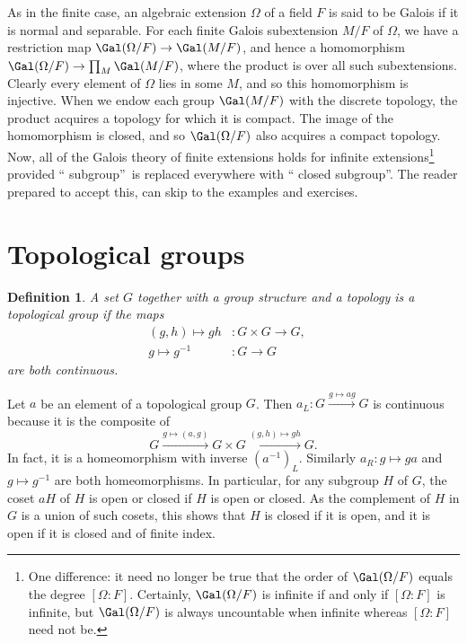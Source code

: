 \documentclass[a4paper,11pt,final,openany]{memoir}
\newtheorem{definition}[X]{Definition}
\theoremstyle{nonumberplain}
\begin{document}
As in the finite case, an algebraic extension $\Omega$ of a field $F$ is said
to be Galois if it is normal and separable. For each finite Galois
subextension $M/F$ of $\Omega$, we have a restriction map $\Gal(\Omega
/F)\rightarrow\Gal(M/F)$, and hence a homomorphism $\Gal(\Omega/F)\rightarrow
\prod\nolimits_{M}\Gal(M/F)$, where the product is over all such
subextensions. Clearly every element of $\Omega$ lies in some $M$, and so this
homomorphism is injective. When we endow each group $\Gal(M/F)$ with the
discrete topology, the product acquires a topology for which it is compact.
The image of the homomorphism is closed, and so $\Gal(\Omega/F)$ also acquires
a compact topology. Now, all of the Galois theory of finite extensions holds
for infinite extensions\footnote{One difference: it need no longer be true
that the order of $\Gal(\Omega/F)$ equals the degree $[\Omega\colon F]$.
Certainly, $\Gal(\Omega/F)$ is infinite if and only if $[\Omega\colon F]$ is
infinite, but $\Gal(\Omega/F)$ is always uncountable when infinite whereas
$[\Omega\colon F]$ need not be.} provided \textquotedblleft
subgroup\textquotedblright\ is replaced everywhere with \textquotedblleft
closed subgroup\textquotedblright. The reader prepared to accept this, can
skip to the examples and exercises.

\section{Topological groups}

\begin{definition}
\label{ig1}A set $G$ together with a group structure and a topology is a%
\emph{topological group }if the maps
\begin{align*}
(g,h)\mapsto gh  &  \colon G\times G\rightarrow G,\quad\\
g\mapsto g^{-1}  &  \colon G\rightarrow G
\end{align*}
are both continuous.
\end{definition}

Let $a$ be an element of a topological group $G$. Then $a_{L}\colon
G\xrightarrow{g\mapsto ag}G$ is continuous because it is the composite of%
\[
G\xrightarrow{g\mapsto(a,g)}G\times G\xrightarrow{(g,h)\mapsto gh}G.
\]
In fact, it is a homeomorphism with inverse $(a^{-1})_{L}$. Similarly
$a_{R}\colon g\mapsto ga$ and $g\mapsto g^{-1}$ are both homeomorphisms. In
particular, for any subgroup $H$ of $G$, the coset $aH$ of $H$ is open or
closed if $H$ is open or closed. As the complement of $H$ in $G$ is a union of
such cosets, this shows that $H$ is closed if it is open, and it is open if it
is closed and of finite index.
\end{document}
